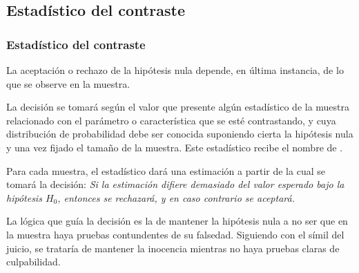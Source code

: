 \subsection{Estadístico del contraste}
\begin{frame}
\frametitle{Estadístico del contraste}
La aceptación o rechazo de la hipótesis nula depende, en última instancia, de lo que se observe en la muestra.

La decisión se tomará según el valor que presente algún estadístico de la muestra relacionado con el parámetro o característica que se esté contrastando, y cuya distribución de probabilidad debe ser conocida suponiendo cierta la hipótesis nula y una vez fijado el tamaño de la muestra.
Este estadístico recibe el nombre de .

Para cada muestra, el estadístico dará una estimación a partir de la cual se tomará la decisión:
\alert{\emph{Si la estimación difiere demasiado del valor esperado bajo la hipótesis $H_0$, entonces se rechazará, y en caso contrario se aceptará.}}

La lógica que guía la decisión es la de mantener la hipótesis nula a no ser que en la muestra haya pruebas contundentes de su falsedad. Siguiendo con el símil del juicio, se trataría de mantener la inocencia mientras no haya pruebas claras de culpabilidad.
\end{frame}



